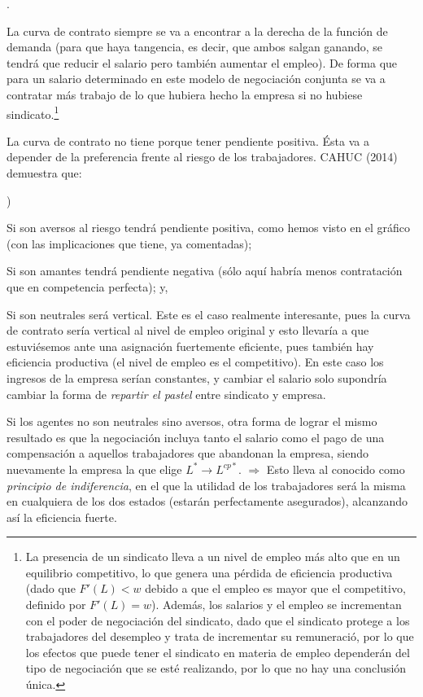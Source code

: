 \documentclass[10pt,a4paper]{article}
\newcounter{alphaitem}
\newcounter{numitem}
\newenvironment{la}
      {\begin{list}{\alph{alphaitem})}{%
          \usecounter{alphaitem}%
          \setlength{\leftmargin}{1cm}%
          \setlength{\parskip}{3pt}%
          \setlength{\itemsep}{0pt}%
          \setlength{\parsep}{0pt}%
      }}
      {\end{list}}
\newenvironment{lnum}
      {\begin{list}{\arabic{numitem}.}{%
          \usecounter{numitem}%
          \setlength{\leftmargin}{1cm}%
          \setlength{\parskip}{3pt}%
          \setlength{\itemsep}{0pt}%
          \setlength{\parsep}{0pt}%
      }}
      {\end{list}}
\begin{document}
\begin{lnum}
    \item La curva de contrato siempre se va a encontrar a la derecha de la función de demanda (para que haya tangencia, es decir, que ambos salgan ganando, se tendrá que reducir el salario pero también aumentar el empleo). De forma que para un salario determinado en este modelo de negociación conjunta se va a contratar más trabajo de lo que hubiera hecho la empresa si no hubiese sindicato.\footnote{%
        La presencia de un sindicato lleva a un nivel de empleo más alto que en un equilibrio competitivo, lo que genera una pérdida de eficiencia productiva (dado que $F'(L) < w$ debido a que el empleo es mayor que el competitivo, definido por $F' (L)=w$). Además, los salarios y el empleo se incrementan con el poder de negociación del sindicato, dado que el sindicato protege a los trabajadores del desempleo y trata de incrementar su remuneració, por lo que los efectos que puede tener el sindicato en materia de empleo dependerán del tipo de negociación que se esté realizando, por lo que no hay una conclusión única.
    }
    \item La curva de contrato no tiene porque tener pendiente positiva. Ésta va a depender de la preferencia frente al riesgo de los trabajadores. CAHUC (2014) demuestra que:
    \begin{la}
        \item Si son aversos al riesgo tendrá pendiente positiva, como hemos visto en el gráfico (con las implicaciones que tiene, ya comentadas);
        \item Si son amantes tendrá pendiente negativa (sólo aquí habría menos contratación que en competencia perfecta); y,
        \item Si son neutrales será vertical. Este es el caso realmente interesante, pues la curva de contrato sería vertical al nivel de empleo original y esto llevaría a que estuviésemos ante una asignación fuertemente eficiente, pues también hay eficiencia productiva (el nivel de empleo es el competitivo). En este caso los ingresos de la empresa serían constantes, y cambiar el salario solo supondría cambiar la forma de \textit{repartir el pastel} entre sindicato y empresa.
    \end{la}
    Si los agentes no son neutrales sino aversos, otra forma de lograr el mismo resultado es que la negociación incluya tanto el salario como el pago de una compensación a aquellos trabajadores que abandonan la empresa, siendo nuevamente la empresa la que elige $L^*\to L^{cp*}$. $\Longrightarrow$ Esto lleva al conocido como \textit{principio de indiferencia}, en el que la utilidad de los trabajadores será la misma en cualquiera de los dos estados (estarán perfectamente asegurados), alcanzando así la eficiencia fuerte.
\end{lnum}
\end{document}
